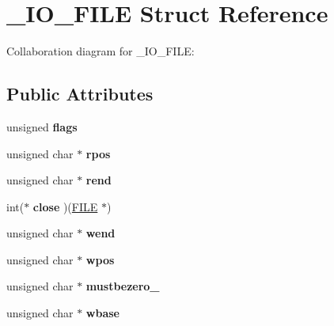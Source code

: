\hypertarget{struct___i_o___f_i_l_e}{}\section{\+\_\+\+I\+O\+\_\+\+F\+I\+LE Struct Reference}
\label{struct___i_o___f_i_l_e}


Collaboration diagram for \+\_\+\+I\+O\+\_\+\+F\+I\+LE\+:
\subsection*{Public Attributes}
\begin{DoxyCompactItemize}
\item 
\mbox{\label{struct___i_o___f_i_l_e_afc03804b1fa743210cab625665a0754f}} 
unsigned {\bfseries flags}
\item 
\mbox{\label{struct___i_o___f_i_l_e_a84877996c06369278e1ed25ba2928de4}} 
unsigned char $\ast$ {\bfseries rpos}
\item 
\mbox{\label{struct___i_o___f_i_l_e_abd37c85696549fc7a42f4a60e5af1777}} 
unsigned char $\ast$ {\bfseries rend}
\item 
\mbox{\label{struct___i_o___f_i_l_e_a1f509de212de265a1d1f4a750c03824d}} 
int($\ast$ {\bfseries close} )(\mbox{\hyperlink{struct___i_o___f_i_l_e}{F\+I\+LE}} $\ast$)
\item 
\mbox{\label{struct___i_o___f_i_l_e_a854a4016c05c17c1c6ff971d2e06c2de}} 
unsigned char $\ast$ {\bfseries wend}
\item 
\mbox{\label{struct___i_o___f_i_l_e_aac95806fff103b15b98e9d3061040a0d}} 
unsigned char $\ast$ {\bfseries wpos}
\item 
\mbox{\label{struct___i_o___f_i_l_e_a6c648e78fcb131bfdf841a69f3b1469e}} 
unsigned char $\ast$ {\bfseries mustbezero\+\_}
\item 
\mbox{\label{struct___i_o___f_i_l_e_af5caad93f57fc52c710dd4c47cbebee4}} 
unsigned char $\ast$ {\bfseries wbase}
\item 

\end{DoxyCompactItemize}
